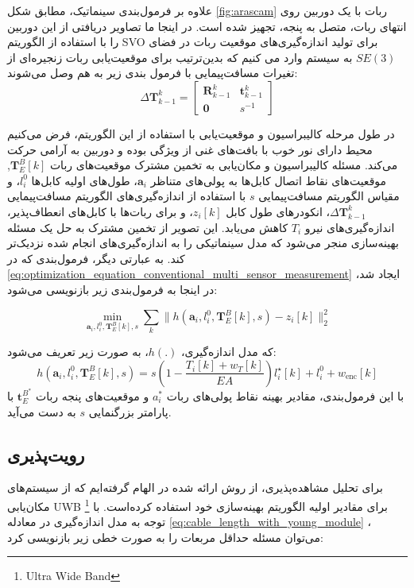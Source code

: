 علاوه بر فرمول‌بندی سینماتیک، مطابق شکل
\ref{fig:arascam}
 ربات با یک دوربین روی انتهای ربات، متصل به پنجه، تجهیز شده است. در اینجا ما تصاویر دریافتی از این دوربین را با استفاده از الگوریتم SVO
\cite{Forster2014ICRA}
  برای تولید اندازه‌گیری‌های موقعیت ربات در فضای
$SE(3)$
به سیستم وارد می کنیم که بدین‌ترتیب برای موقعیت‌یابی ربات زنجیره‌ای از تغیرات مسافت‌پیمایی با فرمول بندی زیر به هم وصل می‌شوند:
\begin{equation}
	\Delta \boldsymbol{T}^k_{k-1} = \begin{bmatrix} \boldsymbol{R}^k_{k-1} & \boldsymbol{t}^k_{k-1} \\ \boldsymbol{0} & s^{-1} \end{bmatrix}
\end{equation}

در طول مرحله کالیبراسیون و موقعیت‌یابی با استفاده از این الگوریتم، فرض می‌کنیم محیط‌ دارای نور خوب با بافت‌های غنی از ویژگی بوده و دوربین به آرامی حرکت می‌کند.  مسئله کالیبراسیون و مکان‌یابی به تخمین مشترک موقعیت‌های ربات
$\boldsymbol{T}^B_E [k]$,
موقعیت‌های نقاط اتصال کابل‌ها به پولی‌های متناظر
$\boldsymbol{a}_i$،
 طول‌های اولیه کابل‌ها
$l_{i}^0$،
و مقیاس الگوریتم مسافت‌پیمایی
$s$
با استفاده از اندازه‌گیری‌های الگوریتم مسافت‌پیمایی
 \( \Delta \boldsymbol{T}^k_{k-1} \)،
انکودرهای طول کابل
$z_i [k]$،
و برای ربات‌ها با کابل‌های انعطاف‌پذیر، اندازه‌گیری‌های نیرو 
$T_i$ 
کاهش می‌یابد. این تصویر از تخمین مشترک به حل یک مسئله بهینه‌سازی منجر می‌شود که مدل سینماتیکی را به اندازه‌گیری‌های انجام شده نزدیک‌تر کند. به عبارتی دیگر، فرمول‌بندی که در
 \ref{eq:optimization_equation_conventional_multi_sensor_measurement} 
 ایجاد شد، در اینجا به فرمول‌بندی زیر بازنویسی می‌شود:

\begin{equation}
	\min_{\boldsymbol{a}_i, l_{i}^0, \boldsymbol{T}^B_E [k], s} \sum_k \| h(\boldsymbol{a}_i, l_{i}^0, \boldsymbol{T}^B_E [k], s) - z_i [k] \|^2_2
\end{equation}

که مدل اندازه‌گیری، \( h(.) \)، به صورت زیر تعریف می‌شود:
\begin{equation} \label{eq:mathmatic_model_rigid_cable}
	h(\boldsymbol{a}_i, l_{i}^0, \boldsymbol{T}^B_E [k], s) = s \left( 1 - \frac{T_i [k] + w_T [k]}{EA} \right) l^\star_i [k] + l_{i}^0 + w_{\text{enc}} [k] 
\end{equation}
با این فرمول‌بندی، مقادیر بهینه نقاط پولی‌های ربات
$a_i^*$
و موقعیت‌های پنجه ربات
$\boldsymbol{t}^{B^{*}}_{E}$
با پارامتر بزرگنمایی
$s$
به دست می‌آید.


\subsection{رویت‌پذیری}
برای تحلیل مشاهده‌پذیری، از روش ارائه شده در
\cite{blueml2021bias}
الهام گرفته‌ایم که از سیستم‌های مکان‌یابی  UWB 
\footnote{Ultra Wide Band}
برای مقادیر اولیه الگوریتم بهینه‌سازی خود استفاده کرده‌است. با توجه به مدل اندازه‌گیری در معادله
\ref{eq:cable_length_with_young_module}
، می‌توان مسئله حداقل مربعات را به صورت خطی زیر بازنویسی کرد:

